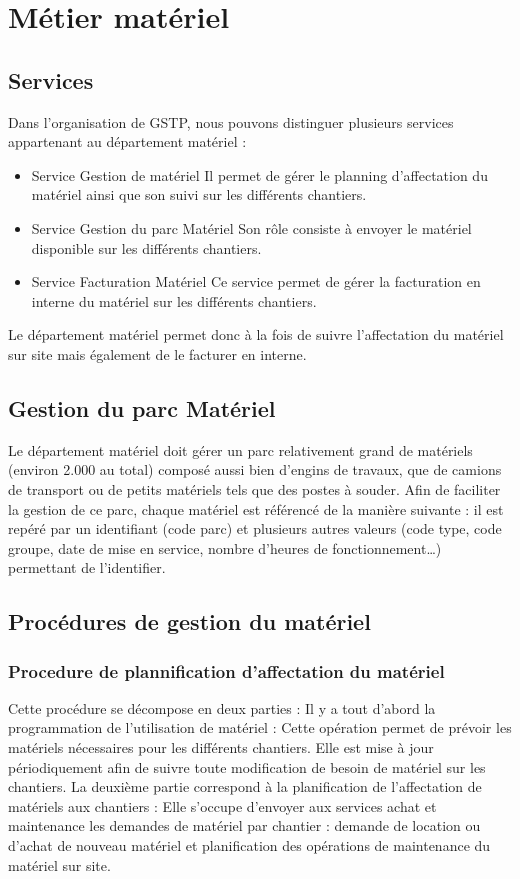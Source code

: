 \section{Métier matériel}
\subsection{Services}
	Dans l’organisation de GSTP, nous pouvons distinguer plusieurs services appartenant au département matériel :
	\begin{itemize}
	\item Service Gestion de matériel
		\subitem Il permet de gérer le planning d’affectation du matériel ainsi que son suivi sur les différents chantiers.
	\item Service Gestion du parc Matériel 
		\subitem Son rôle consiste à envoyer le matériel disponible sur les différents chantiers.
	\item Service Facturation Matériel
		\subitem Ce service permet de gérer la facturation en interne du matériel sur les différents chantiers.
	\end{itemize}	
	Le département matériel permet donc à la fois de suivre l’affectation du matériel sur site mais également de le facturer en interne.

\subsection{Gestion du parc Matériel}
	Le département matériel doit gérer un parc relativement grand de matériels (environ 2.000 au total) composé aussi bien d’engins de travaux, que de camions de transport ou de petits matériels tels que des postes à souder.
Afin de faciliter la gestion de ce parc, chaque matériel est référencé de la manière suivante : il est repéré par un identifiant (code parc) et plusieurs autres valeurs (code type, code groupe, date de mise en service, nombre d’heures de fonctionnement…) permettant de l’identifier.

\subsection{Procédures de gestion du matériel}
	\subsubsection{Procedure de plannification d’affectation du matériel}
	Cette procédure se décompose en deux parties : Il y a tout d’abord la programmation de l’utilisation de matériel : Cette opération permet de prévoir les matériels nécessaires pour les différents chantiers. Elle est mise à jour périodiquement afin de suivre toute modification de besoin de matériel sur les chantiers.
La deuxième partie correspond à la planification de l’affectation de matériels aux chantiers : Elle s’occupe d’envoyer aux services achat et maintenance les demandes de matériel par chantier : demande de location ou d’achat de nouveau matériel et planification des opérations de maintenance du matériel sur site.


